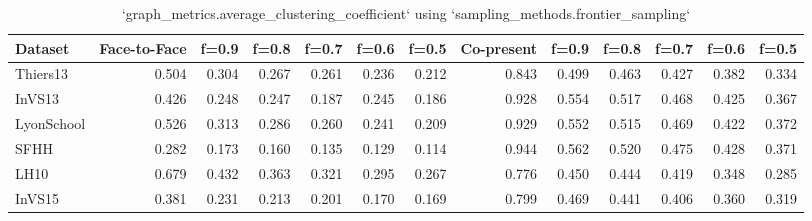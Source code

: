 \begin{table}[ht]
\begin{tabular}{lrrrrrrrrrrrr}
\hline
 Dataset    &   Face-to-Face &   f=0.9 &   f=0.8 &   f=0.7 &   f=0.6 &   f=0.5 &   Co-present &   f=0.9 &   f=0.8 &   f=0.7 &   f=0.6 &   f=0.5 \\
\hline
 Thiers13   &          0.504 &   0.304 &   0.267 &   0.261 &   0.236 &   0.212 &        0.843 &   0.499 &   0.463 &   0.427 &   0.382 &   0.334 \\
 InVS13     &          0.426 &   0.248 &   0.247 &   0.187 &   0.245 &   0.186 &        0.928 &   0.554 &   0.517 &   0.468 &   0.425 &   0.367 \\
 LyonSchool &          0.526 &   0.313 &   0.286 &   0.260 &   0.241 &   0.209 &        0.929 &   0.552 &   0.515 &   0.469 &   0.422 &   0.372 \\
 SFHH       &          0.282 &   0.173 &   0.160 &   0.135 &   0.129 &   0.114 &        0.944 &   0.562 &   0.520 &   0.475 &   0.428 &   0.371 \\
 LH10       &          0.679 &   0.432 &   0.363 &   0.321 &   0.295 &   0.267 &        0.776 &   0.450 &   0.444 &   0.419 &   0.348 &   0.285 \\
 InVS15     &          0.381 &   0.231 &   0.213 &   0.201 &   0.170 &   0.169 &        0.799 &   0.469 &   0.441 &   0.406 &   0.360 &   0.319 \\
\hline
\end{tabular}
\caption{`graph_metrics.average_clustering_coefficient` using `sampling_methods.frontier_sampling`}
\end{table}